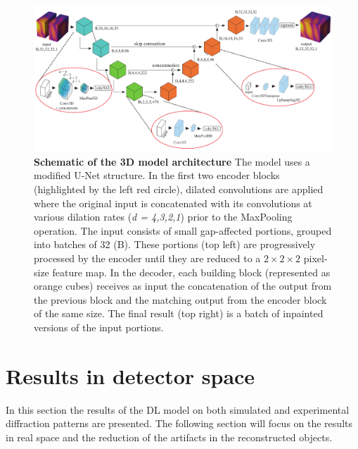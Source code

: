 \begin{figure}[h]
    \centering
    \includegraphics[width=\textwidth]{figures/Inpainting/Architecture_compressed.pdf}
    \caption{\textbf{Schematic of the 3D model architecture} The model uses a modified U-Net structure. 
    In the first two encoder blocks (highlighted by the left red circle), dilated convolutions are applied where the 
    original input is concatenated with its convolutions at various dilation rates (\textit{d = 4,3,2,1}) prior 
    to the MaxPooling operation. The input consists of small gap-affected portions, grouped into batches
     of 32 (B). These portions (top left) are progressively processed by the encoder until they are reduced to a 
     $ 2\times2\times2$ pixel-size feature map. In the decoder, each building block (represented as orange cubes) receives 
     as input the concatenation of the output from the previous block and the matching output from the encoder block 
     of the same size. The final result (top right) is a batch of inpainted versions of the input portions.}

    \label{fig:architecture3d}
\end{figure}

\section{Results in detector space}\label{sec:res_rec}

In this section the results of the DL model on both simulated and experimental diffraction patterns are presented. 
The following section will focus on the results in real space and the reduction of the artifacts 
in the reconstructed objects.\\

